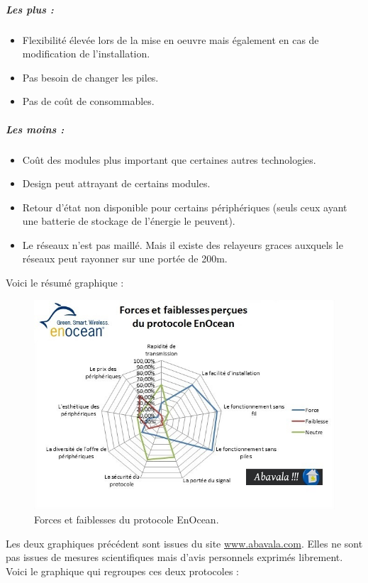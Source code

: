 \documentclass[a4paper,10pt]{article}
\begin{document}
\subparagraph{Les plus :}
\begin{itemize}
\item Flexibilité élevée lors de la mise en oeuvre mais également en cas de modification de l'installation.
\item Pas besoin de changer les piles.
\item Pas de coût de consommables.
\end{itemize}
\subparagraph{Les moins :}
\begin{itemize}
\item Coût des modules plus important que certaines autres technologies.
\item Design peut attrayant de certains modules.
\item Retour d'état non disponible pour certains périphériques (seuls ceux ayant une batterie de stockage de l'énergie le peuvent).
\item Le réseaux n'est pas maillé. Mais il existe des relayeurs graces auxquels le réseaux peut rayonner sur une portée de 200m.\newline
\end{itemize}


Voici le résumé graphique :
\begin{figure}[H]
\centering\includegraphics[scale=0.7]{forces-protocole-enocean.jpg}
\caption{Forces et faiblesses du protocole EnOcean.}
\end{figure}

Les deux graphiques précédent sont issues du site \url{www.abavala.com}. Elles ne sont pas issues de mesures scientifiques mais d’avis personnels exprimés librement. Voici le graphique qui regroupes ces deux protocoles :
\end{document}
